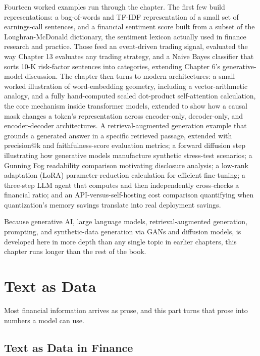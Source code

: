 \documentclass[../ai_in_finance]{subfiles}
\begin{document}
Fourteen worked examples run through the chapter. The first few build representations: a bag-of-words and TF-IDF representation of a small set of earnings-call sentences, and a financial sentiment score built from a subset of the Loughran-McDonald dictionary, the sentiment lexicon actually used in finance research and practice. Those feed an event-driven trading signal, evaluated the way Chapter 13 evaluates any trading strategy, and a Naive Bayes classifier that sorts 10-K risk-factor sentences into categories, extending Chapter 6's generative-model discussion. The chapter then turns to modern architectures: a small worked illustration of word-embedding geometry, including a vector-arithmetic analogy, and a fully hand-computed scaled dot-product self-attention calculation, the core mechanism inside transformer models, extended to show how a causal mask changes a token's representation across encoder-only, decoder-only, and encoder-decoder architectures. A retrieval-augmented generation example that grounds a generated answer in a specific retrieved passage, extended with precision@k and faithfulness-score evaluation metrics; a forward diffusion step illustrating how generative models manufacture synthetic stress-test scenarios; a Gunning Fog readability comparison motivating disclosure analysis; a low-rank adaptation (LoRA) parameter-reduction calculation for efficient fine-tuning; a three-step LLM agent that computes and then independently cross-checks a financial ratio; and an API-versus-self-hosting cost comparison quantifying when quantization's memory savings translate into real deployment savings.

Because generative AI, large language models, retrieval-augmented generation, prompting, and synthetic-data generation via GANs and diffusion models, is developed here in more depth than any single topic in earlier chapters, this chapter runs longer than the rest of the book.

\section{Text as Data}

Most financial information arrives as prose, and this part turns that prose into numbers a model can use.

\subsection{Text as Data in Finance}
\label{sec:text-data}
\end{document}
